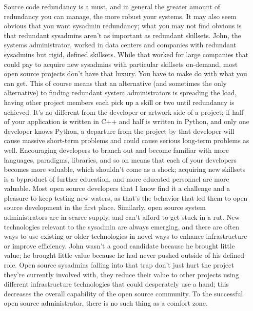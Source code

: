 Source code redundancy is a must, and in general the greater amount of redundancy you can manage, the more robust your systems. It may also seem obvious that you want sysadmin redundancy; what you may not find obvious is that redundant sysadmins aren’t as important as redundant skillsets. John, the systems administrator, worked in data centers and companies with redundant sysadmins but rigid, defined skillsets. While that worked for large companies that could pay to acquire new sysadmins with particular skillsets on-demand, most open source projects don’t have that luxury. You have to make do with what you can get. This of course means that an alternative (and sometimes the only alternative) to finding redundant system administrators is spreading the load, having other project members each pick up a skill or two until redundancy is achieved.
It’s no different from the developer or artwork side of a project; if half of your application is written in C++ and half is written in Python, and only one developer knows Python, a departure from the project by that developer will cause massive short-term problems and could cause serious long-term problems as well. Encouraging developers to branch out and become familiar with more languages, paradigms, libraries, and so on means that each of your developers becomes more valuable, which shouldn’t come as a shock; acquiring new skillsets is a byproduct of further education, and more educated personnel are more valuable.
Most open source developers that I know find it a challenge and a pleasure to keep testing new waters, as that’s the behavior that led them to open source development in the first place. Similarly, open source system administrators are in scarce supply, and can’t afford to get stuck in a rut. New technologies relevant to the sysadmin are always emerging, and there are often ways to use existing or older technologies in novel ways to enhance infrastructure or improve efficiency.
John wasn’t a good candidate because he brought little value; he brought little value because he had never pushed outside of his defined role. Open source sysadmins falling into that trap don’t just hurt the project they’re currently involved with, they reduce their value to other projects using different infrastructure technologies that could desperately use a hand; this decreases the overall capability of the open source community. To the successful open source administrator, there is no such thing as a comfort zone.
 
